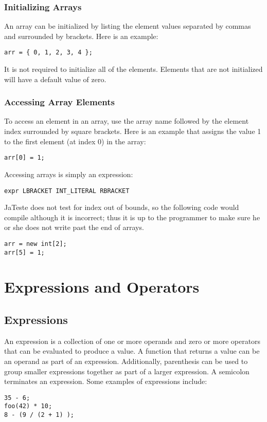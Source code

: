 \documentclass{article}
\begin{document}
\subsubsection{Initializing Arrays}
An array can be initialized by listing the element values separated by commas and surrounded by brackets. Here is an example:

 \begin{lstlisting}
arr = { 0, 1, 2, 3, 4 };
\end{lstlisting}

It is not required to initialize all of the elements. Elements that are not initialized will have a default value of zero.

\subsubsection{Accessing Array Elements}
To access an element in an array, use the array name followed by the element index surrounded by square brackets. Here is an example that assigns the value 1 to the first element (at index 0) in the array:

 \begin{lstlisting}
arr[0] = 1;
\end{lstlisting}

Accessing arrays is simply an expression:
\begin{Verbatim}[frame=single]
 expr LBRACKET INT_LITERAL RBRACKET 
\end{Verbatim}


JaTeste does not test for index out of bounds, so the following code would compile although it is incorrect; thus it is up to the programmer to make sure he or she does not write past the end of arrays. 

 \begin{lstlisting}
arr = new int[2];
arr[5] = 1;
\end{lstlisting}

\section{Expressions and Operators}

\subsection{Expressions}
An expression is a collection of one or more operands and zero or more operators that can be evaluated to produce a value.  A function that returns a value can be an operand as part of an expression.  Additionally, parenthesis can be used to group smaller expressions together as part of a larger expression.  A semicolon terminates an expression.  Some examples of expressions include:
\begin{lstlisting}
35 - 6;
foo(42) * 10;
8 - (9 / (2 + 1) );
\end{lstlisting}
\end{document}
